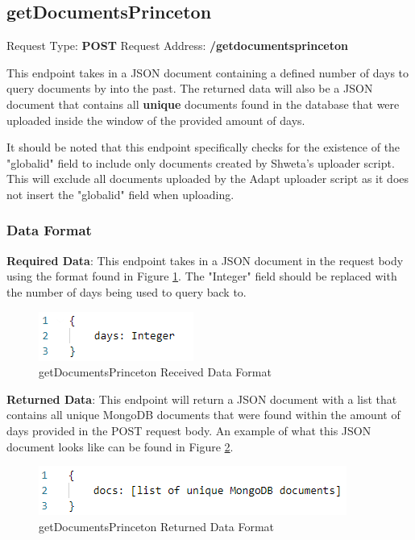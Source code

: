 \subsection{getDocumentsPrinceton}
Request Type: \textbf{POST}
\newline
Request Address: \textbf{/getdocumentsprinceton}
\newline

This endpoint takes in a JSON document containing a defined number of days to query documents by into the past. The returned data will also be a JSON document that contains all \textbf{unique} documents found in the database that were uploaded inside the window of the provided amount of days.

It should be noted that this endpoint specifically checks for the existence of the "globalid" field to include only documents created by Shweta's uploader script. This will exclude all documents uploaded by the Adapt uploader script as it does not insert the "globalid" field when uploading.

\subsubsection{Data Format}
\textbf{Required Data}:
\newline
\newline
This endpoint takes in a JSON document in the request body using the format found in Figure \ref{fig:getdocumentsprinceton1}. The "Integer" field should be replaced with the number of days being used to query back to.
\begin{figure}[H]
    \centering
    \includegraphics{img/getdocumentsprinceton1.PNG}
    \caption{getDocumentsPrinceton Received Data Format}
    \label{fig:getdocumentsprinceton1}
\end{figure}
\textbf{Returned Data}:
\newline
\newline
This endpoint will return a JSON document with a list that contains all unique MongoDB documents that were found within the amount of days provided in the POST request body. An example of what this JSON document looks like can be found in Figure \ref{fig:getdocumentsprinceton2}.

\begin{figure}[H]
    \centering
    \includegraphics{img/getdocumentsprinceton2.PNG}
    \caption{getDocumentsPrinceton Returned Data Format}
    \label{fig:getdocumentsprinceton2}
\end{figure}
